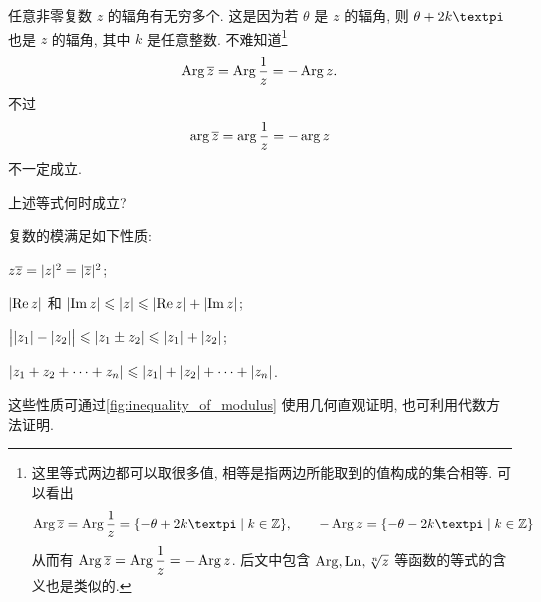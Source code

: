 任意非零复数 $z$ 的辐角有无穷多个.
这是因为若 $\theta$ 是 $z$ 的辐角, 则 $\theta+2k\cpi$ 也是 $z$ 的辐角, 其中 $k$ 是任意整数.
不难知道\footnote{%
这里等式两边都可以取很多值, 相等是指两边所能取到的值构成的集合相等.
可以看出
\[
  \Arg\ov z=\Arg\frac1z=\{-\theta+2k\cpi\mid k\in\BZ\},\qquad
  -\Arg z=\{-\theta-2k\cpi\mid k\in\BZ\}
\]
从而有 $\operatorname{Arg} \overline z=\operatorname{Arg}\dfrac1z=-\operatorname{Arg} z$.
后文中包含 $\operatorname{Arg},\operatorname{Ln},\sqrt[n]{z}$ 等函数的等式的含义也是类似的.
}
\[
  \operatorname{Arg} \overline z=\operatorname{Arg}\frac1z=-\operatorname{Arg} z.
\]
不过
\[
  \arg\overline z=\arg\dfrac1z=-\arg z
\]
\alert{不一定成立}.

\begin{exercise}
  上述等式何时成立?  
\end{exercise}

复数的模满足如下性质:
\begin{enuma}
  \item $z\overline z=\lvert z\rvert^2=\lvert\overline z\rvert^2$;
  \label{enum:modulus-zzbar}
  \item $\lvert\operatorname{Re} z\rvert$ 和 $\lvert\operatorname{Im} z\rvert\leqslant \lvert z\rvert\leqslant\lvert\operatorname{Re} z\rvert+\lvert\operatorname{Im} z\rvert$;
  \label{enum:re-im-less}
  \item $\bigl\vert\lvert z_1\rvert-\lvert z_2\rvert\bigr\vert\leqslant\lvert z_1\pm z_2\rvert\leqslant\lvert z_1\rvert+\lvert z_2\rvert$;
  \label{enum:modulus-triangle-inequality}
  \item $\lvert z_1+z_2+\cdots+z_n\rvert\leqslant\lvert z_1\rvert+\lvert z_2\rvert+\cdots+\lvert z_n\rvert$.
  \label{enum:modulus-nangle-inequality}
\end{enuma}

这些性质可通过\ref{fig:inequality_of_modulus} 使用几何直观证明, 也可利用代数方法证明.

